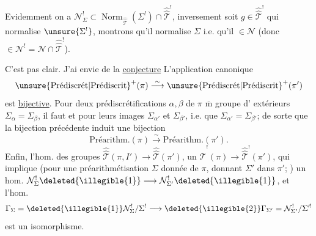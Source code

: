 Evidemment on a
$\mathcal N^{!}_{\Sigma}\subset
\operatorname{Norm}_{\widehat{\widehat{\mathcal T}}}(\Sigma^{!})\cap
\widehat{\widehat{\mathcal T}}^{!}$,
inversement soit $g\in\widehat{\widehat{\mathcal T}}^{!}$ qui normalise
$\unsure{\Sigma^{!}}$, montrons qu'il normalise $\Sigma$ i.e.
qu'il  $\in\mathcal N$
(donc $\in\mathcal N^{!}=\mathcal N\cap\widehat{\widehat{\mathcal T}}^{!}$).


C'est pas clair. J'ai  envie de   la
\uline{conjecture} L'application canonique
\[
\unsure{\text{Prédiscrét}|\text{Prédiscrit}}^{+}(\pi)
 \overset{\sim}{\longrightarrow}
\unsure{\text{Prédiscrét}|\text{Prédiscrit}}^{+}(\pi')
\]
est \uline{bijective}. Pour  deux prédiscrétifications 
$\alpha,\beta$ de $\pi$   $\overline{\mathrm m}$ groupe d' extérieurs
$\Sigma_\alpha=\Sigma_\beta$,  il faut et 
 
pour leurs images $\Sigma_{\alpha'}$ et $\Sigma_{\beta'}$, i.e. que
$\Sigma_{\alpha'}=\Sigma_{\beta'}$; de sorte que la bijection précédente induit une bijection
\[
\text{Préarithm.}(\pi)\overset{\sim}{\longrightarrow}\text{Préarithm.}(\pi').
\]
Enfin, 
l'hom. des groupes 
$\widehat{\widehat{\mathcal T}}(\pi,I')\longrightarrow\widehat{\widehat{\mathcal T}}(\pi')$,
 
un $\widehat{\widehat{\mathcal T}}^{!}(\pi)\longrightarrow\widehat{\widehat{\mathcal T}}^{!}(\pi')$,
 qui implique 
(pour une préarithmétisation $\Sigma$ 
donnée de $\pi$, donnant $\Sigma'$ 
dans $\pi'$; ) un
hom.
$\mathcal N_\Sigma^{!}\deleted{\illegible{1}}\longrightarrow
\mathcal N_{\Sigma'}^{!}\deleted{\illegible{1}}$,
 et l'hom. 
\[
\Gamma_\Sigma=\deleted{\illegible{1}}\mathcal N_\Sigma^{!}/\Sigma^{!}
 \longrightarrow
\deleted{\illegible{2}}\Gamma_{\Sigma'}=\mathcal N_{\Sigma'}^{!}/\Sigma'^{!}
\]
est un isomorphisme.

